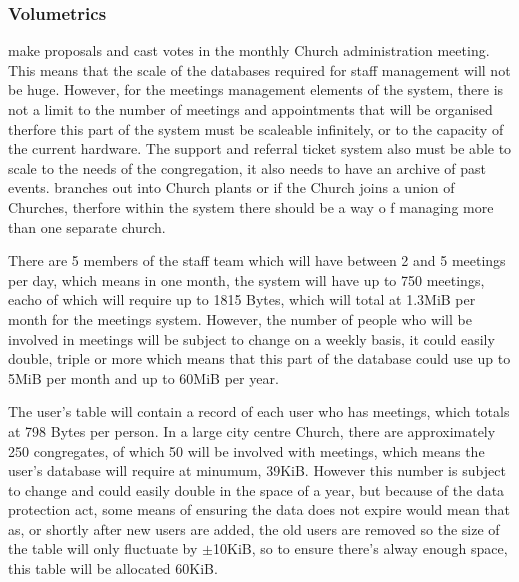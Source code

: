 \subsubsection{Volumetrics}
	make proposals and cast votes in the monthly Church administration meeting. This means that the scale of the databases required for staff
	management will not be huge. However, for the meetings management elements of the system, there is not a limit to the number of meetings 
	and appointments that will be organised therfore this part of the system must be scaleable infinitely, or to the capacity of the current 
	hardware. The support and referral ticket system also must be able to scale to the needs of the congregation, it also needs to have an 
	archive of past events.
	branches out into Church plants or if the Church joins a union of Churches, therfore within the system there should be a way o
	f managing more than one separate church.

	There are 5 members of the staff team which will have between 2 and 5 meetings per day, which means in one month, the system will
	have up to 750 meetings, eacho of which will require up to 1815 Bytes, which will total at 1.3MiB per month for the meetings system. 
	However, the number of people who will be involved in meetings will be subject to change on a weekly basis, it could easily double,
	triple or more which means that this part of the database could use up to 5MiB per month and up to 60MiB per year.

	The user's table will contain a record of each user who has meetings, which totals at 798 Bytes per person. In a large city
	centre Church, there are approximately 250 congregates, of which 50 will be involved with meetings, which means the user's 
	database will require at minumum, 39KiB. However this number is subject to change and could easily double in the space of a year,
	but because of the data protection act, some means of ensuring the data does not expire would mean that as, or shortly after new users
	are added, the old users are removed so the size of the table will only fluctuate by $\pm$10KiB, so to ensure there's alway enough space,
	this table will be allocated 60KiB.

